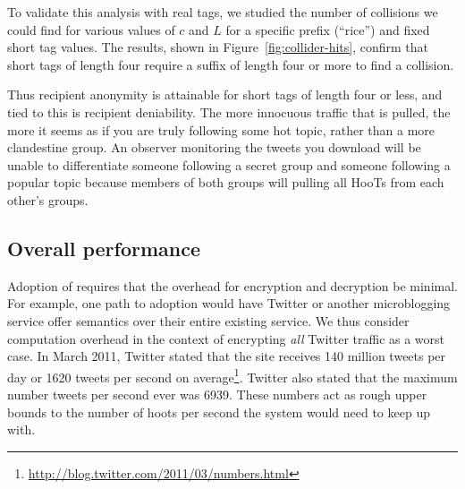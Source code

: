 To validate this analysis with real tags, we studied the number of
collisions we could find for various values of $c$ and $L$ for a
specific prefix (``rice'') and fixed short tag values. The results,
shown in Figure~\ref{fig:collider-hits}, confirm that short tags of
length four require a suffix of length four or more to find a collision.

Thus recipient anonymity is attainable for short tags of length four or
less, and tied to this is recipient deniability. The more innocuous
traffic that is pulled, the more it seems as if you are truly following
some hot topic, rather than a more clandestine group. An observer
monitoring the tweets you download will be unable to differentiate
someone following a secret group and someone following a popular topic
because members of both groups will pulling all HooTs from each other's
groups.
\fi


%

\subsection{Overall \hoot performance}

Adoption of \hoot requires that the overhead for encryption and
decryption be minimal. For example, one path to adoption would have Twitter or
another microblogging service offer \hoot semantics over their entire
existing service. We thus consider computation overhead
in the context of encrypting {\em all} Twitter traffic as a worst case. In
March 2011, Twitter stated that the site receives 140 million tweets per
day or 1620 tweets per second on
average\footnote{\url{http://blog.twitter.com/2011/03/numbers.html}}. Twitter
also stated that the maximum number tweets per second ever was 6939. These numbers act as
rough upper bounds to the number of hoots per second the system would
need to keep up with.

